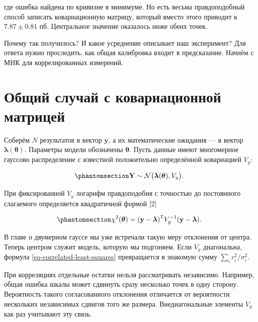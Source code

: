 \documentclass[
  russian,
  11pt,
  a4paper,
  open=any]{scrbook}
\begin{document}
где ошибка найдена по кривизне в минимуме. Но есть весьма правдоподобный
способ записать ковариационную матрицу, который вместо этого приводит к
\(7.87\pm0.81\) пб. Центральное значение оказалось ниже обеих точек.

Почему так получилось? И какое усреднение описывает наш эксперимент? Для
ответа нужно проследить, как общая калибровка входит в предсказание.
Начнём с МНК для коррелированных измерений.

\section{Общий случай с ковариационной
матрицей}\label{ux43eux431ux449ux438ux439-ux441ux43bux443ux447ux430ux439-ux441-ux43aux43eux432ux430ux440ux438ux430ux446ux438ux43eux43dux43dux43eux439-ux43cux430ux442ux440ux438ux446ux435ux439}

Соберём \(N\) результатов в вектор \(\mathbf y\), а их математические
ожидания --- в вектор \(\boldsymbol\lambda(\boldsymbol\theta)\).
Параметры модели обозначены \(\boldsymbol\theta\). Пусть данные имеют
многомерное гауссово распределение с известной положительно определённой
ковариацией \(V_y\):

\begin{equation}\protect\phantomsection\label{eq-ch12-multivariate-data-model}{
\mathbf Y\sim\mathcal N\bigl(\boldsymbol\lambda(\boldsymbol\theta),V_y\bigr).
}\end{equation}

При фиксированной \(V_y\) логарифм правдоподобия с точностью до
постоянного слагаемого определяется квадратичной формой {[}2{]}

\begin{equation}\protect\phantomsection\label{eq-correlated-least-squares}{
\chi^2(\boldsymbol\theta)
=(\mathbf y-\boldsymbol\lambda)^{\mathsf T}V_y^{-1}
(\mathbf y-\boldsymbol\lambda).
}\end{equation}

В главе о двумерном гауссе мы уже встречали такую меру отклонения от
центра. Теперь центром служит модель, которую мы подгоняем. Если \(V_y\)
диагональна, формула \ref{eq-correlated-least-squares} превращается в
знакомую сумму \(\sum_i r_i^2/\sigma_i^2\).

При корреляциях отдельные остатки нельзя рассматривать независимо.
Например, общая ошибка шкалы может сдвинуть сразу несколько точек в одну
сторону. Вероятность такого согласованного отклонения отличается от
вероятности нескольких независимых сдвигов того же размера.
Внедиагональные элементы \(V_y\) как раз учитывают эту связь.
\end{document}
